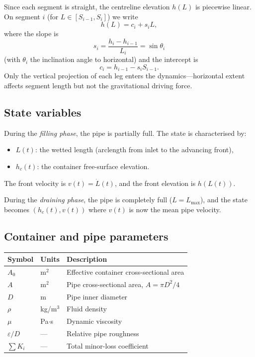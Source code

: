 \documentclass[11pt]{article}
\theoremstyle{definition}
\begin{document}
Since each segment is straight, the centreline elevation $h(L)$ is piecewise linear. On 
segment $i$ (for $L \in [S_{i-1}, S_i]$) we write
\begin{equation}
  h(L) = c_i + s_i L,
  \label{eq:hL-affine}
\end{equation}
where the slope is
\begin{equation}
  s_i = \frac{h_i - h_{i-1}}{L_i} = \sin\theta_i
  \label{eq:slope}
\end{equation}
(with $\theta_i$ the inclination angle to horizontal) and the intercept is
\begin{equation}
  c_i = h_{i-1} - s_i S_{i-1}.
  \label{eq:intercept}
\end{equation}
Only the vertical projection of each leg enters the dynamics---horizontal extent affects 
segment length but not the gravitational driving force.

\subsection{State variables}

During the \emph{filling phase}, the pipe is partially full. The state is characterised by:
\begin{itemize}[nosep]
  \item $L(t)$: the wetted length (arclength from inlet to the advancing front),
  \item $h_c(t)$: the container free-surface elevation.
\end{itemize}
The front velocity is $v(t) = \dot{L}(t)$, and the front elevation is $h(L(t))$.

During the \emph{draining phase}, the pipe is completely full ($L = L_{\max}$), and the 
state becomes $(h_c(t), v(t))$ where $v(t)$ is now the mean pipe velocity.

\subsection{Container and pipe parameters}

\begin{center}
\renewcommand{\arraystretch}{1.2}
\begin{tabular}{lll}
\toprule
Symbol & Units & Description \\
\midrule
$A_0$ & m$^2$ & Effective container cross-sectional area \\
$A$ & m$^2$ & Pipe cross-sectional area, $A = \pi D^2/4$ \\
$D$ & m & Pipe inner diameter \\
$\rho$ & kg/m$^3$ & Fluid density \\
$\mu$ & Pa$\cdot$s & Dynamic viscosity \\
$\varepsilon/D$ & --- & Relative pipe roughness \\
$\sum K_i$ & --- & Total minor-loss coefficient \\
\bottomrule
\end{tabular}
\end{center}
\end{document}
